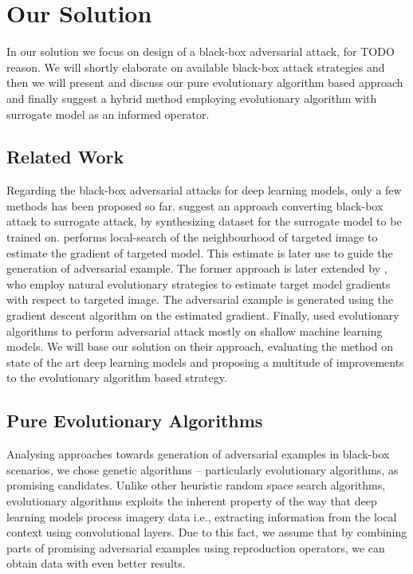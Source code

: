 \chapter{Our Solution}
\label{sec:solution}
In our solution we focus on design of a black-box adversarial attack, for TODO reason. We will shortly elaborate on available black-box attack strategies and then we will present and discuss our pure evolutionary algorithm based approach and finally suggest a hybrid method employing evolutionary algorithm with surrogate model as an informed operator.

\section{Related Work}
Regarding the black-box adversarial attacks for deep learning models, only a few methods has been proposed so far. \cite{DBLP:journals/corr/PapernotMGJCS16} suggest an approach converting black-box attack to surrogate attack, by synthesizing dataset for the surrogate model to be trained on. \cite{8014906} performs local-search of the neighbourhood of targeted image to estimate the gradient of targeted model. This estimate is later use to guide the generation of adversarial example. The former approach is later extended by \cite{DBLP:journals/corr/abs-1804-08598}, who employ natural evolutionary strategies to estimate target model gradients with respect to targeted image. The adversarial example is generated using the gradient descent algorithm on the estimated gradient. Finally, \cite{Vidnerova:2016:EGA:2955129.2955178} used evolutionary algorithms to perform adversarial attack mostly on shallow machine learning models. We will base our solution on their approach, evaluating the method on state of the art deep learning models and proposing a multitude of improvements to the evolutionary algorithm based strategy.

\section{Pure Evolutionary Algorithms}
\label{sec:pea}
Analysing approaches towards generation of adversarial examples in black-box scenarios, we chose genetic algorithms -- particularly evolutionary algorithms, as promising candidates. Unlike other heuristic random space search algorithms, evolutionary algorithms exploits the inherent property of the way that deep learning models process imagery data i.e., extracting information from the local context using convolutional layers. Due to this fact, we assume that by combining parts of promising adversarial examples using reproduction operators, we can obtain data with even better results.

